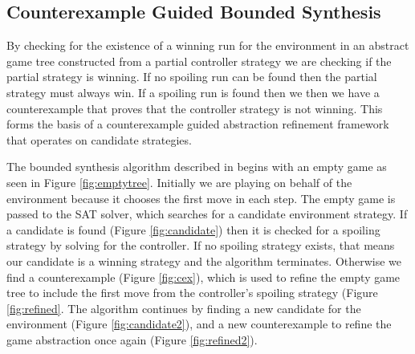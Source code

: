 \documentclass{llncs}
\begin{document}
\subsection{Counterexample Guided Bounded Synthesis}

By checking for the existence of a winning run for the environment in an
abstract game tree constructed from a partial controller strategy we are
checking if the partial strategy is winning. If no spoiling run can be found
then the partial strategy must always win. If a spoiling run is found then we
then we have a counterexample that proves that the controller strategy is not
winning. This forms the basis of a counterexample guided abstraction refinement
framework that operates on candidate strategies.

The bounded synthesis algorithm described in \cite{narodytska2014} begins with
an empty game as seen in Figure \ref{fig:emptytree}.  Initially we are playing
on behalf of the environment because it chooses the first move in each step.
The empty game is passed to the SAT solver, which searches for a candidate
environment strategy.  If a candidate is found (Figure \ref{fig:candidate})
then it is checked for a spoiling strategy by solving for the controller.  If
no spoiling strategy exists, that means our candidate is a winning strategy and
the algorithm terminates.  Otherwise we find a counterexample (Figure
\ref{fig:cex}), which is used to refine the empty game tree to include the
first move from the controller's spoiling strategy (Figure \ref{fig:refined}.
The algorithm continues by finding a new candidate for the environment (Figure
\ref{fig:candidate2}), and a new counterexample to refine the game abstraction
once again (Figure \ref{fig:refined2}).
\end{document}
